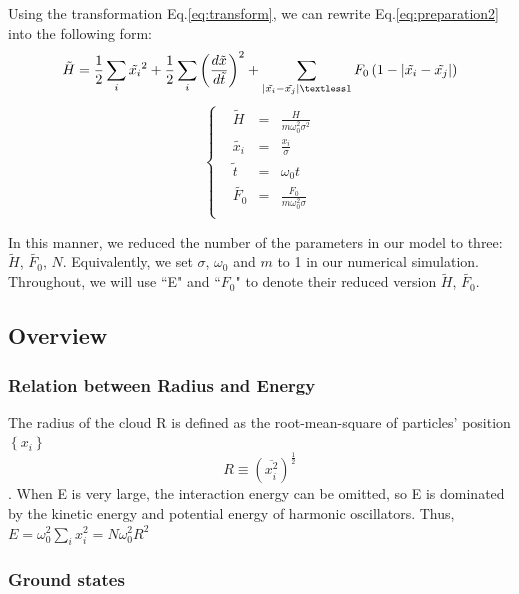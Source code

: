 \documentclass[aps,preprintnumbers,onecolumn,amsmath,amssymb,floatfix,pra]{revtex4-1}
\begin{document}
Using the transformation Eq.\ref{eq:transform}, we can rewrite Eq.\ref{eq:preparation2} into the following form:
\begin{equation}
\tilde{H}=\frac{1}{2}\sum_{i}\tilde{x_i}^2+\frac{1}{2}\sum_i\left(\frac{d\tilde{x}}{d\tilde{t}}\right)^2+\sum_{\left|\tilde{x_i}-\tilde{x_j}\right|\textless 1}F_0\left(1-\left|\tilde{x_i}-\tilde{x_j}\right|\right)
\end{equation}
\begin{equation}
\left\lbrace
\begin{aligned}
&\tilde{H}&=&\frac{H}{m\omega_0^2\sigma^2}\\
&\tilde{x_i}&=&\frac{x_i}{\sigma}\\
&\tilde{t}&=&\omega_0t\\
&\tilde{F_0}&=&\frac{F_0}{m\omega_0^2\sigma}\\
\end{aligned}
\right.
\label{eq:transform}
\end{equation} 


In this manner, we reduced the number of the parameters in our model to three: $\tilde{H}$,
$\tilde{F_0}$, $N$. Equivalently, we set $\sigma$, $\omega_0$ and $m$ to 1 in our numerical
simulation. Throughout, we will use ``E" and ``$F_0$" to denote their reduced version $\tilde{H}$,
$\tilde{F_0}$.

\subsection{Overview}
\subsubsection{Relation between Radius and Energy}
The radius of the cloud R is defined as the root-mean-square of particles' position $\left\lbrace x_i\right\rbrace$
\begin{equation}
R\equiv\left(\overline{x_i^2}\right)^\frac{1}{2}
\label{eq:def_of_R}
\end{equation}. When E is very large, the interaction energy can be omitted, so E is dominated by the kinetic energy and potential energy of harmonic oscillators. Thus, $E=\omega_0^2\sum_{i}x_i^2=N\omega_0^2R^2$ 



\subsubsection{Ground states}
\end{document}
